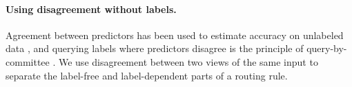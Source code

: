 \paragraph{Using disagreement without labels.}
Agreement between predictors has been used to estimate accuracy on unlabeled data \citep{platanios2014estimating,garg2022atc}, and querying labels where predictors disagree is the principle of query-by-committee \citep{seung1992qbc}. We use disagreement between two views of the same input to separate the label-free and label-dependent parts of a routing rule.
